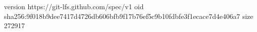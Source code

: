 version https://git-lfs.github.com/spec/v1
oid sha256:9f018b9dee7417d4726db606bfb9f17b76ef5c9b10fdbfe3f1ecace7d4e406a7
size 272917
